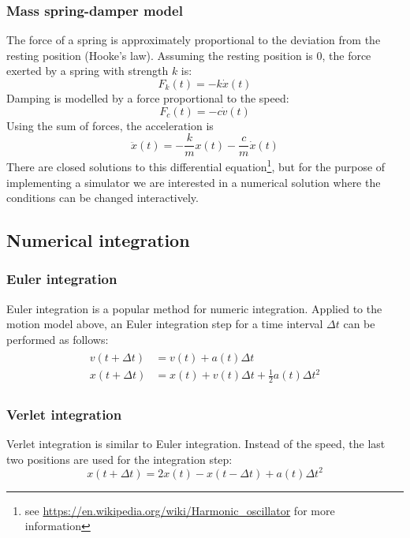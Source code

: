 \documentclass[12pt,a4paper,twoside]{article}
\begin{document}
\subsubsection{Mass spring-damper model}
The force of a spring is approximately proportional to the deviation from the resting position (Hooke's law).
Assuming the resting position is $0$, the force exerted by a spring with strength $k$ is:
\begin{equation*}
  F_k(t)=-k \dot x(t)
\end{equation*}
Damping is modelled by a force proportional to the speed:
\begin{equation*}
  F_c(t)=-c \dot v(t)
\end{equation*}
Using the sum of forces, the acceleration is
\begin{equation*}
  \ddot{x}(t) = -\frac{k}{m} x(t) - \frac{c}{m}\dot{x}(t)
\end{equation*}
There are closed solutions to this differential equation\footnote{see \url{https://en.wikipedia.org/wiki/Harmonic_oscillator} for more information}, but for the purpose of implementing a simulator we are interested in a numerical solution where the conditions can be changed interactively.

\subsection{Numerical integration}
\subsubsection{Euler integration}
Euler integration is a popular method for numeric integration.
Applied to the motion model above, an Euler integration step for a time interval $\Delta t$ can be performed as follows:
\begin{align*}
  \begin{split}
    v(t + \Delta t) &= v(t) + a(t) \Delta t\\
    x(t + \Delta t) &= x(t) + v(t) \Delta t + \frac{1}{2} a(t) \Delta t^2
  \end{split}
\end{align*}

\subsubsection{Verlet integration}
Verlet integration is similar to Euler integration. Instead of the speed, the last two positions are used for the integration step:
\begin{equation*}
  x(t + \Delta t) = 2 x(t) - x(t - \Delta t) + a(t) \Delta t^2
\end{equation*}
\end{document}
